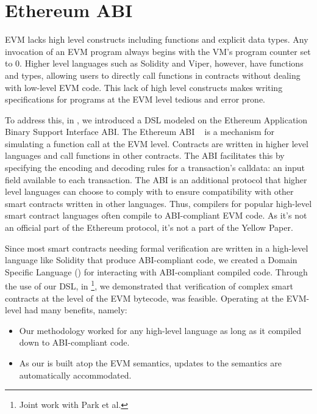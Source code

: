 \section{Ethereum ABI \DSL{}}\label{sec:ethereum-abi-dsl}

EVM lacks high level constructs including functions and explicit data types.
Any invocation of an EVM program always begins with the VM’s program counter set to 0.
Higher level languages such as Solidity and Viper, however, have functions and types, allowing users to directly call functions in contracts without dealing with low-level EVM code.
This lack of high level constructs makes writing specifications for programs
at the EVM level tedious and error prone.

To address this, in \cite{HildenbrandtCSF18}, we introduced a DSL modeled on the
Ethereum Application Binary Support Interface ABI.
The Ethereum ABI ~\cite{EthereumAbiUrl} is a mechanism for simulating a function call at the EVM level.
Contracts are written in higher level languages and call functions in other contracts.
The ABI facilitates this by specifying the encoding and decoding rules for a transaction's
calldata: an input field available to each transaction. The ABI
is an additional protocol that higher level
languages can choose to comply with to ensure compatibility with other smart
contracts written in other languages. Thus, compilers for popular high-level
smart contract languages often compile to ABI-compliant EVM code. As it's not
an official part of the Ethereum protocol, it's not a part of the Yellow Paper.

Since most smart contracts needing formal verification are written in a high-level
language like Solidity \cite{SolidityUrl} that produce ABI-compliant code, we
created a Domain Specific Language (\DSL{}) for interacting with ABI-compliant compiled
code. Through the use of our DSL, in \cite{ParkFSE18} \footnote{Joint work with Park et al.},
we demonstrated that verification of complex smart contracts at the level of the
EVM bytecode, was feasible. Operating at the EVM-level had many benefits,
namely:
\begin{itemize}
  \item Our methodology worked for any high-level language as long as it
    compiled down to ABI-compliant code.
  \item As our \DSL{} is built atop the EVM semantics, updates to the semantics
    are automatically accommodated.
\end{itemize}


